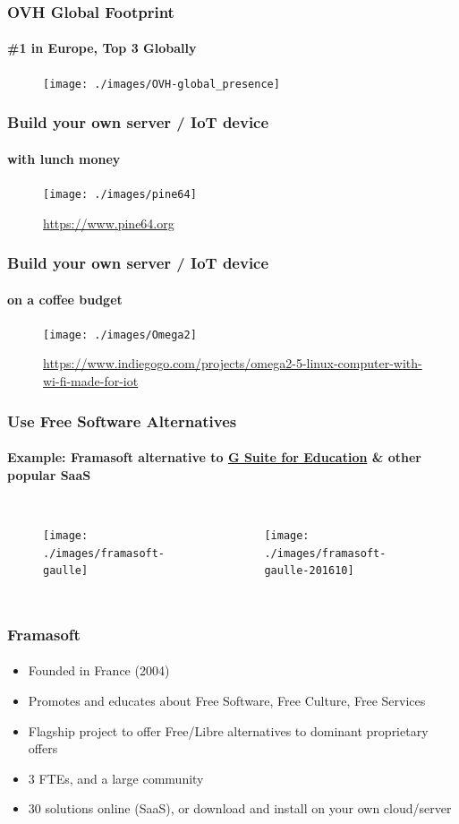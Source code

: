 	\begin{frame}
	\frametitle{OVH Global Footprint}
	\framesubtitle{\#1 in Europe, Top 3 Globally}
	        \begin{figure}[h]
                \centering
                \texttt{[image: ./images/OVH-global\_presence]}
        	\end{figure}
	\end{frame}

	\begin{frame}
	\frametitle{Build your own server / IoT device}
	\framesubtitle{with lunch money}
	        \begin{figure}[h]
                \centering
                \texttt{[image: ./images/pine64]}
		\caption{\url{https://www.pine64.org}}
        	\end{figure}
	\end{frame}

	\begin{frame}
	\frametitle{Build your own server / IoT device}
	\framesubtitle{on a coffee budget}
	        \begin{figure}[h]
                \centering
                \texttt{[image: ./images/Omega2]}
		\caption{\tiny{\url{https://www.indiegogo.com/projects/omega2-5-linux-computer-with-wi-fi-made-for-iot}}}
        	\end{figure}
	\end{frame}

	\begin{frame}
	\frametitle{Use Free Software Alternatives}
	\framesubtitle{Example: Framasoft alternative to \href{https://blog.google/topics/education/introducing-g-suite-education/}{G Suite for Education} \& other popular SaaS}
	\begin{columns}
		\column{0.5\textwidth}
	        	\begin{figure}[h]
               		\centering
                	\texttt{[image: ./images/framasoft-gaulle]}
        		\end{figure}
		\column{0.5\textwidth}
	        	\begin{figure}[h]
                	\centering
                	\texttt{[image: ./images/framasoft-gaulle-201610]}
        		\end{figure}
	\end{columns}
	\end{frame}

	\begin{frame}
	\frametitle{Framasoft}
	\framesubtitle{}
		\begin{itemize}
			\item Founded in France (2004)
			\item Promotes and educates about Free Software, Free Culture, Free Services
			\item Flagship project to offer Free/Libre alternatives to dominant proprietary offers
			\item 3 FTEs, and a large community
			\item 30 solutions online (SaaS), or download and install on your own cloud/server
		\end{itemize}
	\end{frame}


